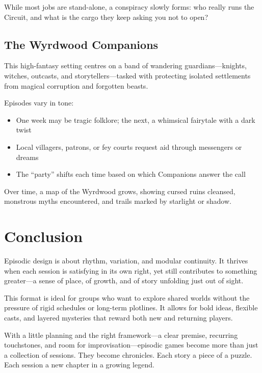 \vspace{0.5\baselineskip}
\noindent
While most jobs are stand-alone, a conspiracy slowly forms: who really runs the Circuit, and what is the cargo they keep asking you not to open?

\subsection*{The Wyrdwood Companions}

This high-fantasy setting centres on a band of wandering guardians—knights, witches, outcasts, and storytellers—tasked with protecting isolated settlements from magical corruption and forgotten beasts.

\vspace{0.5\baselineskip}
\noindent
Episodes vary in tone:
\begin{itemize}
    \item One week may be tragic folklore; the next, a whimsical fairytale with a dark twist
    \item Local villagers, patrons, or fey courts request aid through messengers or dreams
    \item The “party” shifts each time based on which Companions answer the call
\end{itemize}

\vspace{0.5\baselineskip}
\noindent
Over time, a map of the Wyrdwood grows, showing cursed ruins cleansed, monstrous myths encountered, and trails marked by starlight or shadow.

\section{Conclusion}

Episodic design is about rhythm, variation, and modular continuity. It thrives when each session is satisfying in its own right, yet still contributes to something greater—a sense of place, of growth, and of story unfolding just out of sight.

This format is ideal for groups who want to explore shared worlds without the pressure of rigid schedules or long-term plotlines. It allows for bold ideas, flexible casts, and layered mysteries that reward both new and returning players.

With a little planning and the right framework—a clear premise, recurring touchstones, and room for improvisation—episodic games become more than just a collection of sessions. They become chronicles. Each story a piece of a puzzle. Each session a new chapter in a growing legend.

